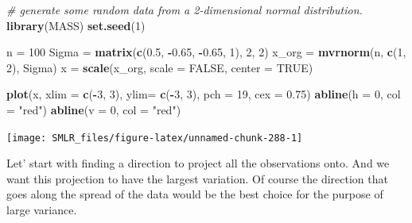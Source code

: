 \documentclass[
]{book}
\newenvironment{Shaded}{\begin{snugshade}}{\end{snugshade}}
\newcommand{\AttributeTok}[1]{\textcolor[rgb]{0.13,0.29,0.53}{#1}}
\newcommand{\CommentTok}[1]{\textcolor[rgb]{0.56,0.35,0.01}{\textit{#1}}}
\newcommand{\ConstantTok}[1]{\textcolor[rgb]{0.56,0.35,0.01}{#1}}
\newcommand{\DecValTok}[1]{\textcolor[rgb]{0.00,0.00,0.81}{#1}}
\newcommand{\FloatTok}[1]{\textcolor[rgb]{0.00,0.00,0.81}{#1}}
\newcommand{\FunctionTok}[1]{\textcolor[rgb]{0.13,0.29,0.53}{\textbf{#1}}}
\newcommand{\NormalTok}[1]{#1}
\newcommand{\OtherTok}[1]{\textcolor[rgb]{0.56,0.35,0.01}{#1}}
\newcommand{\SpecialCharTok}[1]{\textcolor[rgb]{0.81,0.36,0.00}{\textbf{#1}}}
\newcommand{\StringTok}[1]{\textcolor[rgb]{0.31,0.60,0.02}{#1}}
\theoremstyle{definition}
\theoremstyle{definition}
\theoremstyle{definition}
\theoremstyle{definition}
\theoremstyle{remark}
\begin{document}
\begin{Shaded}
\begin{Highlighting}[]
  \CommentTok{\# generate some random data from a 2{-}dimensional normal distribution. }
  \FunctionTok{library}\NormalTok{(MASS)}
  \FunctionTok{set.seed}\NormalTok{(}\DecValTok{1}\NormalTok{)}
  
\NormalTok{  n }\OtherTok{=} \DecValTok{100}
\NormalTok{  Sigma }\OtherTok{=} \FunctionTok{matrix}\NormalTok{(}\FunctionTok{c}\NormalTok{(}\FloatTok{0.5}\NormalTok{, }\SpecialCharTok{{-}}\FloatTok{0.65}\NormalTok{, }\SpecialCharTok{{-}}\FloatTok{0.65}\NormalTok{, }\DecValTok{1}\NormalTok{), }\DecValTok{2}\NormalTok{, }\DecValTok{2}\NormalTok{)}
\NormalTok{  x\_org }\OtherTok{=} \FunctionTok{mvrnorm}\NormalTok{(n, }\FunctionTok{c}\NormalTok{(}\DecValTok{1}\NormalTok{, }\DecValTok{2}\NormalTok{), Sigma)}
\NormalTok{  x }\OtherTok{=} \FunctionTok{scale}\NormalTok{(x\_org, }\AttributeTok{scale =} \ConstantTok{FALSE}\NormalTok{, }\AttributeTok{center =} \ConstantTok{TRUE}\NormalTok{)}
\end{Highlighting}
\end{Shaded}

\begin{Shaded}
\begin{Highlighting}[]
  \FunctionTok{plot}\NormalTok{(x, }\AttributeTok{xlim =} \FunctionTok{c}\NormalTok{(}\SpecialCharTok{{-}}\DecValTok{3}\NormalTok{, }\DecValTok{3}\NormalTok{), }\AttributeTok{ylim=} \FunctionTok{c}\NormalTok{(}\SpecialCharTok{{-}}\DecValTok{3}\NormalTok{, }\DecValTok{3}\NormalTok{), }
       \AttributeTok{pch =} \DecValTok{19}\NormalTok{, }\AttributeTok{cex =} \FloatTok{0.75}\NormalTok{)}
  \FunctionTok{abline}\NormalTok{(}\AttributeTok{h =} \DecValTok{0}\NormalTok{, }\AttributeTok{col =} \StringTok{"red"}\NormalTok{)}
  \FunctionTok{abline}\NormalTok{(}\AttributeTok{v =} \DecValTok{0}\NormalTok{, }\AttributeTok{col =} \StringTok{"red"}\NormalTok{)}
\end{Highlighting}
\end{Shaded}

\begin{center}\texttt{[image: SMLR\_files/figure-latex/unnamed-chunk-288-1]} \end{center}

Let' start with finding a direction to project all the observations onto. And we want this projection to have the largest variation. Of course the direction that goes along the spread of the data would be the best choice for the purpose of large variance.
\end{document}
